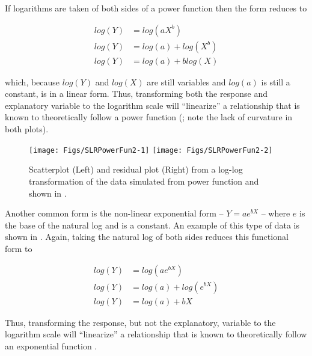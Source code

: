 \documentclass[10pt,openany]{book}\usepackage[]{graphicx}\usepackage[]{color}
\newenvironment{knitrout}{}{} %
\begin{document}
If logarithms are taken of both sides of a power function then the form reduces to

\[ \begin{split}
  log(Y) &= log(aX^{b}) \\
  log(Y) &= log(a) + log(X^{b}) \\
  log(Y) &= log(a) + blog(X)
\end{split} \]

which, because $log(Y)$ and $log(X)$ are still variables and $log(a)$ is still a constant, is in a linear form.  Thus, transforming both the response and explanatory variable to the logarithm scale will ``linearize'' a relationship that is known to theoretically follow a power function (; note the lack of curvature in both plots).

\begin{knitrout}
\color{fgcolor}\begin{figure}[h]

{\centering \texttt{[image: Figs/SLRPowerFun2-1]} 
\texttt{[image: Figs/SLRPowerFun2-2]} 

}

\caption[log-log transform of power function]{Scatterplot (Left) and residual plot (Right) from a log-log transformation of the data simulated from power function and shown in .}\label{fig:SLRPowerFun2}
\end{figure}


\end{knitrout}
\vspace{9pt}
Another common form is the non-linear exponential form -- $Y=ae^{bX}$ -- where $e$ is the base of the natural log and is a constant.  An example of this type of data is shown in .  Again, taking the natural log of both sides reduces this functional form to

\[ \begin{split}
  log(Y) &= log(ae^{bX}) \\
  log(Y) &= log(a) + log(e^{bX}) \\
  log(Y) &= log(a) + bX
\end{split} \]

Thus, transforming the response, but not the explanatory, variable to the logarithm scale will ``linearize'' a relationship that is known to theoretically follow an exponential function .
\end{document}
